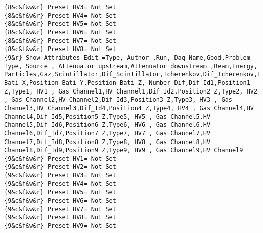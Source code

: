 {\begin{lstlisting}[breaklines=true,basicstyle=\tiny,postbreak=\mbox{\textcolor{red}{$\hookrightarrow$}\space},]
{8&c&f&w&r} Preset HV3= Not Set
{8&c&f&w&r} Preset HV4= Not Set
{8&c&f&w&r} Preset HV5= Not Set
{8&c&f&w&r} Preset HV6= Not Set
{8&c&f&w&r} Preset HV7= Not Set
{8&c&f&w&r} Preset HV8= Not Set
{9&r} Show Attributes Edit =Type, Author ,Run, Daq Name,Good,Problem Type, Source , Attenuator upstream,Attenuator downstream ,Beam,Energy, Particles,Gaz,Scintillator,Dif_Scintillator,Tcherenkov,Dif_Tcherenkov,Position Bati X,Position Bati Y,Position Bati Z, Number Dif,Dif_Id1,Position1 Z,Type1, HV1 , Gas Channel1,HV Channel1,Dif_Id2,Position2 Z,Type2, HV2 , Gas Channel2,HV Channel2,Dif_Id3,Position3 Z,Type3, HV3 , Gas Channel3,HV Channel3,Dif_Id4,Position4 Z,Type4, HV4 , Gas Channel4,HV Channel4,Dif_Id5,Position5 Z,Type5, HV5 , Gas Channel5,HV Channel5,Dif_Id6,Position6 Z,Type6, HV6 , Gas Channel6,HV Channel6,Dif_Id7,Position7 Z,Type7, HV7 , Gas Channel7,HV Channel7,Dif_Id8,Position8 Z,Type8, HV8 , Gas Channel8,HV Channel8,Dif_Id9,Position9 Z,Type9, HV9 , Gas Channel9,HV Channel9
{9&c&f&w&r} Preset HV1= Not Set
{9&c&f&w&r} Preset HV2= Not Set
{9&c&f&w&r} Preset HV3= Not Set
{9&c&f&w&r} Preset HV4= Not Set
{9&c&f&w&r} Preset HV5= Not Set
{9&c&f&w&r} Preset HV6= Not Set
{9&c&f&w&r} Preset HV7= Not Set
{9&c&f&w&r} Preset HV8= Not Set
{9&c&f&w&r} Preset HV9= Not Set
\end{lstlisting}
}